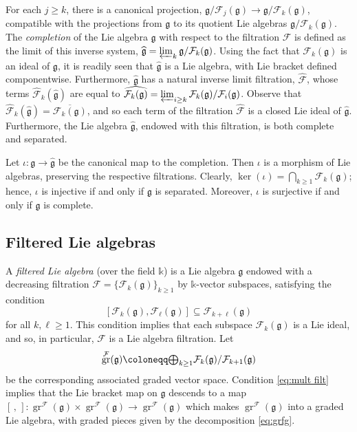 \documentclass{article}
\numberwithin{equation}{section}
\theoremstyle{definition}
\renewcommand{\k}{\mathbb{k}}
\newcommand{\F}{\mathcal{F}}
\newcommand{\g}{{\mathfrak{g}}}
\DeclareMathOperator{\gr}{gr}
\newcommand{\boplus}{\mbox{\normalsize $\bigoplus$}}
\begin{document}
For each $j\ge k$, there is a canonical projection, $\g/\F_j(\g)\to \g/\F_k(\g)$, 
compatible with the projections from $\g$ to its quotient Lie algebras $\g/\F_k(\g)$.  
The {\em completion}\/ of the Lie algebra $\g$ with respect to the filtration 
$\F$ is defined as the limit of this inverse system, 
$\widehat{\g}= \varprojlim\nolimits_{k}\g/\F_k(\g)$. 
Using the fact that $\F_k(\g)$ is an ideal of $\g$,
it is readily seen that $\widehat{\g}$ is a Lie algebra, with Lie bracket 
defined componentwise.  Furthermore, $\widehat{\g}$ has 
a natural inverse limit filtration, $\widehat{\F}$, whose terms 
$\widehat{\F}_k (\widehat{\g})$ are equal to $\widehat{\F_k(\g)}= 
\varprojlim\nolimits_{i\ge k}\F_k (\g)/\F_i (\g)$.
Observe  that $\widehat{\F}_k (\widehat{\g}) = \overline{\F_k (\g)} $, 
and so each term of the filtration $\widehat{\F}$ is a closed 
Lie ideal of $\widehat{\g}$.   Furthermore, the Lie algebra 
$\widehat{\g}$, endowed with this filtration, is both complete and separated. 

Let $\iota\colon \g\to \widehat{\g}$ be the canonical map to the completion.  
Then $\iota$ is a morphism of Lie algebras, preserving the respective 
filtrations.  Clearly, $\ker(\iota)=\bigcap_{k\ge 1} \F_k (\g)$;   
hence, $\iota$ is injective if and only if $\g$ is separated.  
Moreover, $\iota$ is surjective if and only if $\g$ is complete. 

\subsection{Filtered Lie algebras}
\label{subsec:filt lie}
A  {\em filtered Lie algebra}\/ (over the field $\k$) 
is a Lie algebra $\g$ endowed with a decreasing filtration 
$\F=\{\F_k (\g) \}_{k\ge 1}$ by $\k$-vector  subspaces, 
satisfying the condition 
\begin{equation}
\label{eq:mult filt}
[\F_k (\g),\F_{\ell} (\g) ]\subseteq \F_{k+\ell} (\g)
\end{equation}
for all $k, \ell\ge 1$.  This condition implies that each subspace $\F_k(\g)$ 
is a Lie ideal, and so, in particular, $\F$ is a Lie algebra filtration. Let 
\begin{equation}
\label{eq:grfg}
\gr^{\F}(\g)\coloneqq \boplus_{k\ge 1}\F_k(\g)/ \F_{k+1}(\g) 
\end{equation}
be the corresponding associated graded vector space. 
Condition \eqref{eq:mult filt} implies that the Lie bracket map on 
$\g$ descends to a map 
$[\,,\,]\colon \gr^{\F}(\g) \times \gr^{\F}(\g) \to \gr^{\F}(\g)$ 
which makes $\gr^{\F}(\g)$ into a graded Lie algebra, with 
graded pieces given by the decomposition \eqref{eq:grfg}. 
\end{document}
